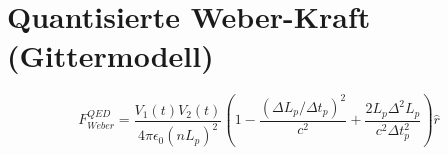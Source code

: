 \section{Quantisierte Weber-Kraft (Gittermodell)}
\[ F_{Weber}^{QED} = \frac{V_1(t) V_2(t)}{4\pi\epsilon_0 (nL_p)^2} \left(1 - \frac{(\Delta L_p / \Delta t_p)^2}{c^2} + \frac{2 L_p \Delta^2 L_p}{c^2 \Delta t_p^2}\right)\hat{r} \]